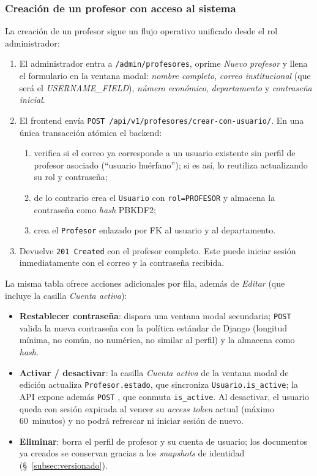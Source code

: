 \subsubsection{Creación de un profesor con acceso al sistema}

La creación de un profesor sigue un flujo operativo unificado desde el rol administrador:

\begin{enumerate}
    \item El administrador entra a \texttt{/admin/profesores}, oprime \emph{Nuevo profesor} y llena el formulario en la ventana modal: \emph{nombre completo}, \emph{correo institucional} (que será el \emph{USERNAME\_FIELD}), \emph{número económico}, \emph{departamento} y \emph{contraseña inicial}.
    \item El frontend envía \texttt{POST /api/v1/profesores/crear-con-usuario/}. En una única transacción atómica el backend:
    \begin{enumerate}
        \item verifica si el correo ya corresponde a un usuario existente sin perfil de profesor asociado (``usuario huérfano''); si es así, lo reutiliza actualizando su rol y contraseña;
        \item de lo contrario crea el \texttt{Usuario} con \texttt{rol=PROFESOR} y almacena la contraseña como \emph{hash} PBKDF2;
        \item crea el \texttt{Profesor} enlazado por FK al usuario y al departamento.
    \end{enumerate}
    \item Devuelve \texttt{201 Created} con el profesor completo. Este puede iniciar sesión inmediatamente con el correo y la contraseña recibida.
\end{enumerate}

La misma tabla ofrece acciones adicionales por fila, además de \emph{Editar} (que incluye la casilla \emph{Cuenta activa}):

\begin{itemize}
    \item \textbf{Restablecer contraseña}: dispara una ventana modal secundaria; \texttt{POST}  valida la nueva contraseña con la política estándar de Django (longitud mínima, no común, no numérica, no similar al perfil) y la almacena como \emph{hash}.
    \item \textbf{Activar / desactivar}: la casilla \emph{Cuenta activa} de la ventana modal de edición actualiza \texttt{Profesor.estado}, que sincroniza \texttt{Usuario.is\_active}; la API expone además \texttt{POST} , que conmuta \texttt{is\_active}. Al desactivar, el usuario queda con sesión expirada al vencer su \emph{access token} actual (máximo 60~minutos) y no podrá refrescar ni iniciar sesión de nuevo.
    \item \textbf{Eliminar}: borra el perfil de profesor y su cuenta de usuario; los documentos ya creados se conservan gracias a los \emph{snapshots} de identidad (\S~\ref{subsec:versionado}).
\end{itemize}

